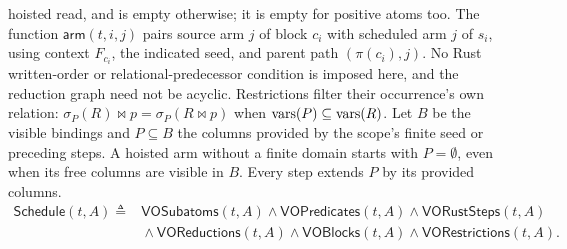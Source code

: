 hoisted read, and is empty otherwise; it is empty for positive atoms too.
The function $\mathsf{arm}(t,i,j)$ pairs source arm $j$ of block $c_i$
with scheduled arm $j$ of $s_i$, using context $F_{c_i}$, the indicated seed,
and parent path $(\pi(c_i),j)$.
No Rust written-order or relational-predecessor condition is imposed here,
and the reduction graph need not be acyclic.
Restrictions filter their occurrence's own relation:
$\sigma_P(R)\bowtie p=\sigma_P(R\bowtie p)$ when $\operatorname{vars}(P)\subseteq\operatorname{vars}(R)$.
Let $B$ be the visible bindings and $P\subseteq B$ the columns provided by
the scope's finite seed or preceding steps. A hoisted arm without a finite
domain starts with $P=\emptyset$, even when its free columns are visible in $B$.
Every step extends $P$ by its provided columns.
\[
\begin{aligned}
\mathsf{Schedule}(t,A)\triangleq{}&
 \mathsf{VOSubatoms}(t,A)\land\mathsf{VOPredicates}(t,A)
 \land\mathsf{VORustSteps}(t,A)\\
 &{}\land\mathsf{VOReductions}(t,A)\land\mathsf{VOBlocks}(t,A)
 \land\mathsf{VORestrictions}(t,A).
\end{aligned}
\]

